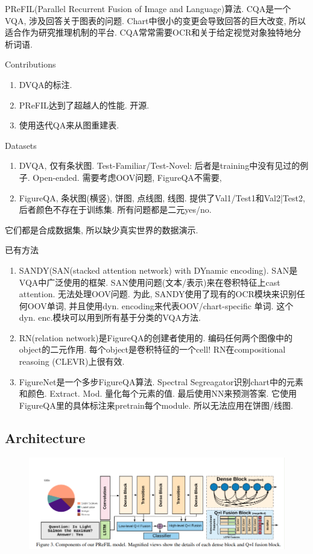 \documentclass{article}
\begin{document}
PReFIL(Parallel Recurrent Fusion of Image and Language)算法. 
CQA是一个VQA, 涉及回答关于图表的问题. Chart中很小的变更会导致回答的巨大改变, 所以适合作为研究推理机制的平台. CQA常常需要OCR和关于给定视觉对象独特地分析词语.

Contributions
\begin{enumerate}
    \item DVQA的标注.
    \item PReFIL达到了超越人的性能. 开源.
    \item 使用迭代QA来从图重建表.
\end{enumerate}

Datasets
\begin{enumerate}
    \item DVQA, 仅有条状图. Test-Familiar/Test-Novel: 后者是training中没有见过的例子. Open-ended. 需要考虑OOV问题, FigureQA不需要,
    \item FigureQA, 条状图(横竖), 饼图, 点线图, 线图. 提供了Val1/Test1和Val2|Test2, 后者颜色不存在于训练集. 所有问题都是二元yes/no.
\end{enumerate}
它们都是合成数据集, 所以缺少真实世界的数据演示.

已有方法
\begin{enumerate}
    \item SANDY(SAN(stacked attention network) with DYnamic encoding). SAN是VQA中广泛使用的框架. SAN使用问题(文本/表示)来在卷积特征上cast attention. 无法处理OOV问题. 为此, SANDY使用了现有的OCR模块来识别任何OOV单词, 并且使用dyn. encoding来代表OOV/chart-specific 单词. 这个dyn. enc.模块可以用到所有基于分类的VQA方法.
    \item RN(relation network)是FigureQA的创建者使用的. 编码任何两个图像中的object的二元作用. 每个object是卷积特征的一个cell! RN在compositional reasoing (CLEVR)上很有效.
    \item FigureNet是一个多步FigureQA算法. Spectral Segreagator识别chart中的元素和颜色. Extract. Mod. 量化每个元素的值. 最后使用NN来预测答案. 它使用FigureQA里的具体标注来pretrain每个module. 所以无法应用在饼图/线图.
\end{enumerate}

\subsection{Architecture}

\begin{figure}[htbp]
    \centering
    \includegraphics[width=\textwidth]{prefil-arch.png}
\end{figure}
\end{document}
